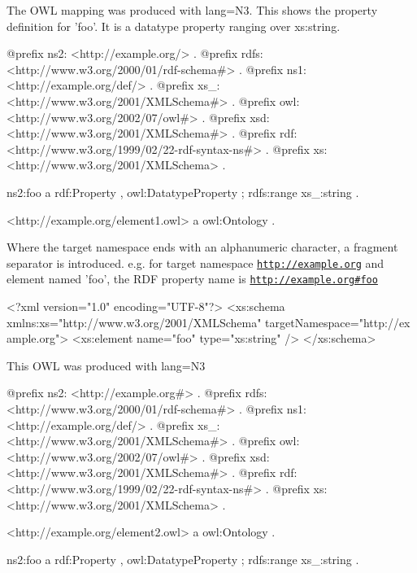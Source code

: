 The OWL mapping was produced with lang=N3. This shows the property definition for 'foo'. It is a datatype property ranging over xs:string.


\begin{DoxyCodeInclude}
@prefix ns2:     <http://example.org/> .
@prefix rdfs:    <http://www.w3.org/2000/01/rdf-schema#> .
@prefix ns1:     <http://example.org/def/> .
@prefix xs_:     <http://www.w3.org/2001/XMLSchema#> .
@prefix owl:     <http://www.w3.org/2002/07/owl#> .
@prefix xsd:     <http://www.w3.org/2001/XMLSchema#> .
@prefix rdf:     <http://www.w3.org/1999/02/22-rdf-syntax-ns#> .
@prefix xs:      <http://www.w3.org/2001/XMLSchema> .

ns2:foo
      a       rdf:Property , owl:DatatypeProperty ;
      rdfs:range xs_:string .

<http://example.org/element1.owl>
      a       owl:Ontology .
\end{DoxyCodeInclude}


Where the target namespace ends with an alphanumeric character, a fragment separator is introduced. e.g. for target namespace \href{http://example.org}{\tt http://example.org} and element named 'foo', the RDF property name is \href{http://example.org#foo}{\tt http://example.org\#foo}


\begin{DoxyCodeInclude}
<?xml version="1.0" encoding="UTF-8"?>
<xs:schema xmlns:xs="http://www.w3.org/2001/XMLSchema" targetNamespace="http://ex
      ample.org">
        <xs:element name="foo" type="xs:string" />
</xs:schema>
\end{DoxyCodeInclude}


This OWL was produced with lang=N3


\begin{DoxyCodeInclude}
@prefix ns2:     <http://example.org#> .
@prefix rdfs:    <http://www.w3.org/2000/01/rdf-schema#> .
@prefix ns1:     <http://example.org/def/> .
@prefix xs_:     <http://www.w3.org/2001/XMLSchema#> .
@prefix owl:     <http://www.w3.org/2002/07/owl#> .
@prefix xsd:     <http://www.w3.org/2001/XMLSchema#> .
@prefix rdf:     <http://www.w3.org/1999/02/22-rdf-syntax-ns#> .
@prefix xs:      <http://www.w3.org/2001/XMLSchema> .

<http://example.org/element2.owl>
      a       owl:Ontology .

ns2:foo
      a       rdf:Property , owl:DatatypeProperty ;
      rdfs:range xs_:string .
\end{DoxyCodeInclude}


